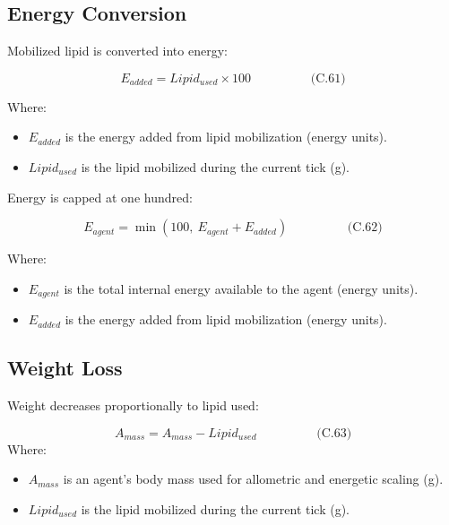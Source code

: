 \documentclass[
]{book}
\providecommand{\tightlist}{%
  \setlength{\itemsep}{0pt}\setlength{\parskip}{0pt}}
\begin{document}
\subsection{Energy Conversion}\label{energy-conversion-1}

Mobilized lipid is converted into energy:

\[
\begin{equation} E_{added} = Lipid_{used} \times 100  \hspace{2cm} \text{(C.61)} \end{equation}
\]

Where:

\begin{itemize}
\tightlist
\item
  \(E_{added}\) is the energy added from lipid mobilization (energy
  units).
\item
  \(Lipid_{used}\) is the lipid mobilized during the current tick (g).
\end{itemize}

Energy is capped at one hundred:

\[
\begin{equation} E_{agent} = \min(100,\ E_{agent} + E_{added})  \hspace{2cm} \text{(C.62)} \end{equation}
\]

Where:

\begin{itemize}
\tightlist
\item
  \(E_{agent}\) is the total internal energy available to the agent
  (energy units).
\item
  \(E_{added}\) is the energy added from lipid mobilization (energy
  units).
\end{itemize}

\subsection{Weight Loss}\label{weight-loss}

Weight decreases proportionally to lipid used:

\[
\begin{equation} A_{mass} = A_{mass} - Lipid_{used}  \hspace{2cm} \text{(C.63)} \end{equation}
\] Where:

\begin{itemize}
\tightlist
\item
  \(A_{mass}\) is an agent's body mass used for allometric and energetic
  scaling (g).
\item
  \(Lipid_{used}\) is the lipid mobilized during the current tick (g).
\end{itemize}
\end{document}
